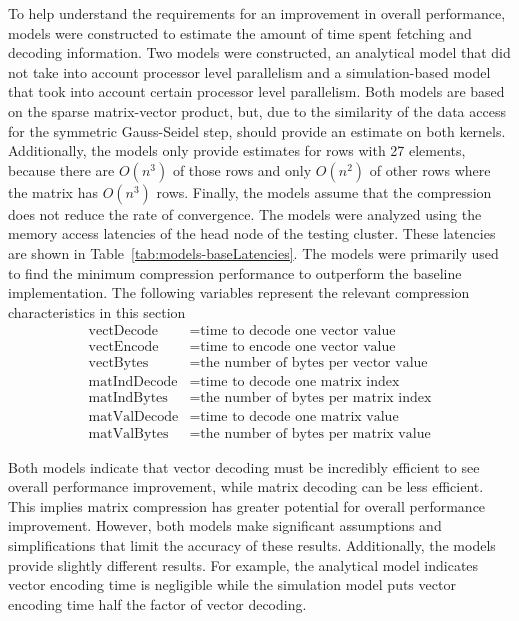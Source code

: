 
To help understand the requirements for an improvement in overall performance, models were constructed to estimate the amount of time spent fetching and decoding information.
Two models were constructed, an analytical model that did not take into account processor level parallelism and a simulation-based model that took into account certain processor level parallelism.
Both models are based on the sparse matrix-vector product, but, due to the similarity of the data access for the symmetric Gauss-Seidel step, should provide an estimate on both kernels.
Additionally, the models only provide estimates for rows with 27 elements, because there are \(O(n^3)\) of those rows and only \(O(n^2)\) of other rows where the matrix has \(O(n^3)\) rows.
Finally, the models assume that the compression does not reduce the rate of convergence.
The models were analyzed using the memory access latencies of the head node of the testing cluster.
These latencies are shown in Table~\ref{tab:models-baseLatencies}.
The models were primarily used to find the minimum compression performance to outperform the baseline implementation.
The following variables represent the relevant compression characteristics in this section
\begin{align*}
	\mathrm{vectDecode} &= \text{time to decode one vector value} \\
	\mathrm{vectEncode}  &= \text{time to encode one vector value} \\
	\mathrm{vectBytes} &= \text{the number of bytes per vector value} \\
	\mathrm{matIndDecode} &= \text{time to decode one matrix index} \\
	\mathrm{matIndBytes} &= \text{the number of bytes per matrix index} \\
	\mathrm{matValDecode} &= \text{time to decode one matrix value} \\
	\mathrm{matValBytes} &= \text{the number of bytes per matrix value}
\end{align*}



Both models indicate that vector decoding must be incredibly efficient to see overall performance improvement, while matrix decoding can be less efficient.
This implies matrix compression has greater potential for overall performance improvement.
However, both models make significant assumptions and simplifications that limit the accuracy of these results.
Additionally, the models provide slightly different results.
For example, the analytical model indicates vector encoding time is negligible while the simulation model puts vector encoding time half the factor of vector decoding.

